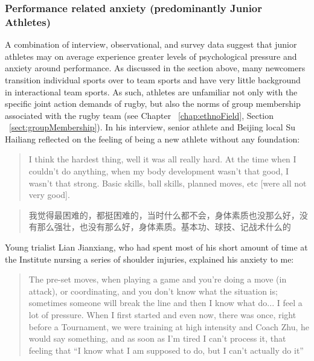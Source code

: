 \begin{CJK}{UTF8}{gbsn}
\subsubsection{Performance related anxiety (predominantly Junior Athletes)}

A combination of interview, observational, and survey data suggest that junior athletes may on average experience greater levels of psychological pressure and anxiety around performance.  As discussed in the section above, many newcomers transition individual sports over to team sports and have very little background in interactional team sports. As such, athletes are unfamiliar not only with the specific joint action demands of rugby, but also the norms of group membership associated with the rugby team (see Chapter ~\ref{chap:ethnoField}, Section ~\ref{sect:groupMembership}).  In his interview, senior athlete and Beijing local Su Hailiang reflected on the feeling of being a new athlete without any foundation:

\begin{quotation}
    I think the hardest thing, well it was all really hard.  At the time when I couldn't do anything, when my body development wasn't that good, I wasn't that strong.  Basic skills, ball skills, planned moves, etc [were all not very good].
\end{quotation}

\begin{quotation}
    我觉得最困难的，都挺困难的，当时什么都不会，身体素质也没那么好，没有那么强壮，也没有那么好，身体素质。基本功、球技、记战术什么的 
\end{quotation}

Young trialist Lian Jianxiang, who had spent most of his short amount of time at the Institute nursing a series of shoulder injuries, explained his anxiety to me:

    \begin{quotation}
      The pre-set moves, when playing a game and you’re doing a move (in attack), or coordinating, and you don’t know what the situation is; sometimes someone will break the line and then I know what do... I feel a lot of pressure.  When I first started and even now, there was once, right before a Tournament, we were training at high intensity and Coach Zhu, he would say something, and as soon as I'm tired I can't process it, that feeling that ``I know what I am supposed to do, but I can't actually do it''
    \end{quotation}


\end{CJK}
